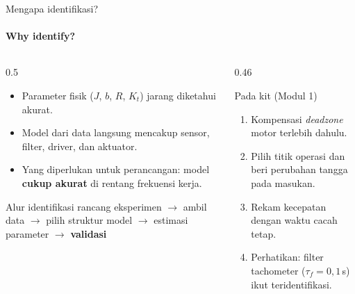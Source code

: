 \documentclass[aspectratio=169,10pt]{beamer}
\begin{document}
\begin{frame}{Mengapa identifikasi?}
	\framesubtitle{Why identify?}
	\begin{columns}[T]
		\begin{column}{0.5\textwidth}
			\begin{itemize}
				\item Parameter fisik ($J$, $b$, $R$, $K_t$) jarang diketahui akurat.
				\item Model dari data langsung mencakup sensor, filter, driver, dan aktuator.
				\item Yang diperlukan untuk perancangan: model \textbf{cukup akurat} di rentang frekuensi kerja.
			\end{itemize}
			\vspace{0.1cm}
			\begin{block}{Alur identifikasi}
				\small
				rancang eksperimen $\rightarrow$ ambil data $\rightarrow$ pilih struktur model $\rightarrow$ estimasi parameter $\rightarrow$ \textbf{validasi}
			\end{block}
		\end{column}
		\begin{column}{0.46\textwidth}
			\begin{exampleblock}{Pada kit (Modul 1)}
				\small
				\begin{enumerate}
					\item Kompensasi \textit{deadzone} motor terlebih dahulu.
					\item Pilih titik operasi dan beri perubahan tangga pada masukan.
					\item Rekam kecepatan dengan waktu cacah tetap.
					\item Perhatikan: filter tachometer ($\tau_f = 0{,}1$\,s) ikut teridentifikasi.
				\end{enumerate}
			\end{exampleblock}
		\end{column}
	\end{columns}
\end{frame}
\end{document}
